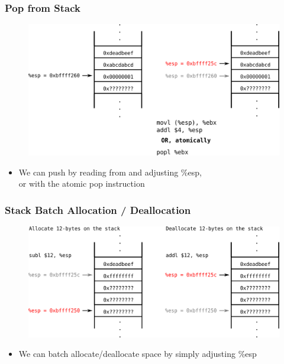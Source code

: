 \documentclass[11pt,xcolor=dvipsnames]{beamer}
\newcommand{\mvs}{\vspace{-0.95em}}
\begin{document}
\begin{frame}[fragile,t]
\frametitle{Pop from Stack}
\begin{figure}
\centering
\includegraphics[height=0.6\paperheight]{figures/x86stackpop.png}
\end{figure}
\begin{itemize}
\item We can push by reading from and adjusting {\ttfamily \%esp}, \\ or with the atomic {\ttfamily pop} instruction
\end{itemize}
\end{frame}

\begin{frame}[fragile]
\frametitle{Stack Batch Allocation / Deallocation}
\mvs
\begin{figure}
\centering
\includegraphics[width=\textwidth]{figures/x86stackalloc.png}
\end{figure}
\begin{itemize}
\item We can batch allocate/deallocate space by simply adjusting {\ttfamily \%esp}
\end{itemize}
\end{frame}
\end{document}

